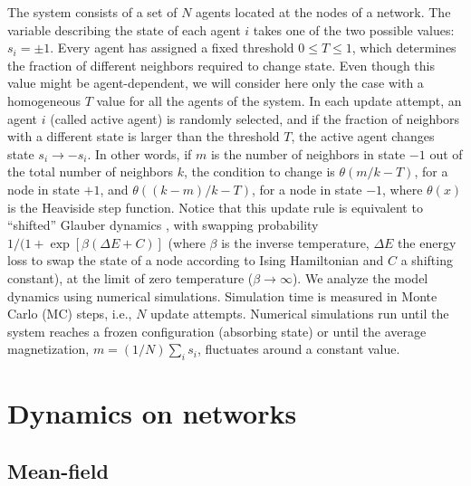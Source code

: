 The system consists of a set of $N$ agents located at the nodes of a network. The variable describing the state of each agent $i$ takes one of the two possible values: $s_i = \pm 1$. Every agent has assigned a fixed threshold $0 \leq T \leq 1$, which determines the fraction of different neighbors required to change state. Even though this value might be agent-dependent, we will consider here only the case with a homogeneous $T$ value for all the agents of the system. In each update attempt, an agent $i$ (called active agent) is randomly selected, and if the fraction of neighbors with a different state is larger than the threshold $T$, the active agent changes state $s_i \to -s_i$. In other words, if $m$ is the number of neighbors in state $-1$ out of the total number of neighbors $k$, the condition to change is $\theta(m/k - T)$, for a node in state $+1$, and $\theta((k-m)/k - T)$, for a node in state $-1$, where $\theta(x)$ is the Heaviside step function. Notice that this update rule is equivalent to ``shifted'' Glauber dynamics \cite{glauber1963time}, with swapping probability $1/(1+\exp[\beta(\Delta E + C)]$ (where $\beta$ is the inverse temperature, $\Delta E$ the energy loss to swap the state of a node according to Ising Hamiltonian and $C$ a shifting constant), at the limit of zero temperature ($\beta \to \infty$). We analyze the model dynamics using numerical simulations. Simulation time is measured in Monte Carlo (MC) steps, i.e., $N$ update attempts. Numerical simulations run until the system reaches a frozen configuration (absorbing state) or until the average magnetization, $m = (1/N) \sum_i s_i$, fluctuates around a constant value.

\section{\label{sec:Dynamics on networks} Dynamics on networks}

\subsection{Mean-field}

